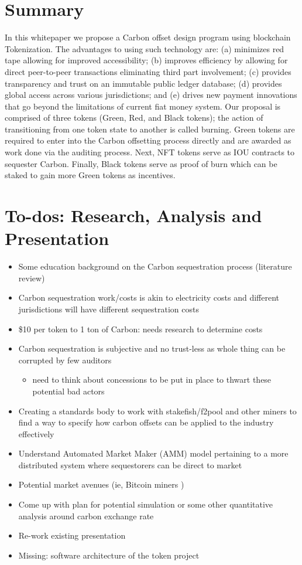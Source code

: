 \documentclass{article}
\begin{document}
\section{Summary}

In this whitepaper we propose a Carbon offset design program using blockchain Tokenization. The advantages to using such technology are: (a) minimizes red tape allowing for improved accessibility; (b) improves efficiency by allowing for direct peer-to-peer transactions eliminating third part involvement; (c) provides transparency and trust on an immutable public ledger database; (d) provides global access across various jurisdictions; and (e) drives new payment innovations that go beyond the limitations of current fiat money system. Our proposal is comprised of three tokens (Green, Red, and Black tokens); the action of transitioning from one token state to another is called burning. Green tokens are required to enter into the Carbon offsetting process directly and are awarded as work done via the auditing process. Next, NFT tokens serve as IOU contracts to sequester Carbon. Finally, Black tokens serve as proof of burn which can be staked to gain more Green tokens as incentives.  

\section{To-dos: Research, Analysis and Presentation}

\begin{itemize}
\item Some education background on the Carbon sequestration process (literature review)
\item Carbon sequestration work/costs is akin to electricity costs and different jurisdictions will have different sequestration costs
\item \$10 per token to 1 ton of Carbon: needs research to determine costs
\item Carbon sequestration is subjective and no trust-less  as whole thing can be corrupted by few auditors
\begin{itemize}
\item need to think about concessions to be put in place to thwart these potential bad actors
\end{itemize}
\item Creating a standards body to work with stakefish/f2pool and other miners to find a way to
specify how carbon offsets can be applied to the industry effectively
\item Understand Automated Market Maker (AMM) model pertaining to a more distributed system where sequestorers can be direct to market
\item Potential market avenues (ie, Bitcoin miners )
\item Come up with plan for potential simulation or some other quantitative analysis around carbon exchange rate
\item Re-work existing presentation
\item Missing: software architecture of the token project
\end{itemize}
\end{document}
